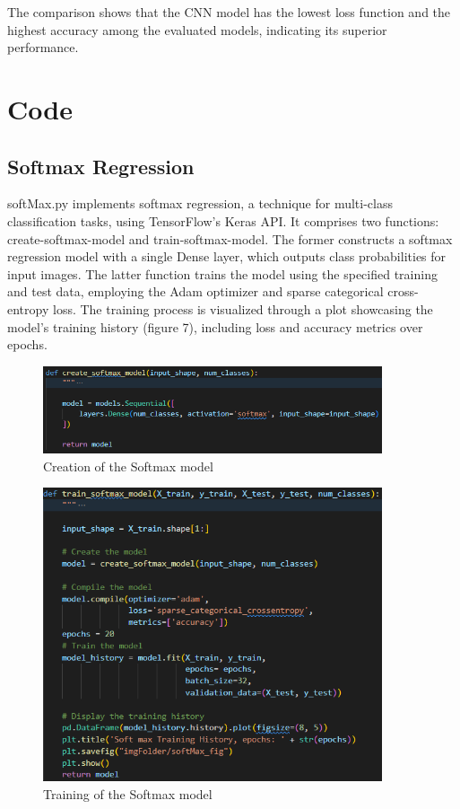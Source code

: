 \documentclass{article}
\begin{document}
The comparison shows that the CNN model has the lowest loss function and the highest accuracy among the evaluated models, indicating its superior performance.
\newpage
\section{Code}
\subsection{Softmax Regression}
softMax.py implements softmax regression, a technique for multi-class classification tasks, using TensorFlow's Keras API. It comprises two functions: create-softmax-model and train-softmax-model. The former constructs a softmax regression model with a single Dense layer, which outputs class probabilities for input images. The latter function trains the model using the specified training and test data, employing the Adam optimizer and sparse categorical cross-entropy loss. The training process is visualized through a plot showcasing the model's training history (figure 7), including loss and accuracy metrics over epochs.

\begin{figure}[H]
    \caption{Creation of the Softmax model}
    \centering
    \includegraphics[width=10cm]{../imgFolder/create_softmax_model.png}
\end{figure}

\begin{figure}[H]
    \caption{Training of the Softmax model}
    \centering
    \includegraphics[width=10cm]{../imgFolder/train_softmax_model.png}
\end{figure}
\end{document}

